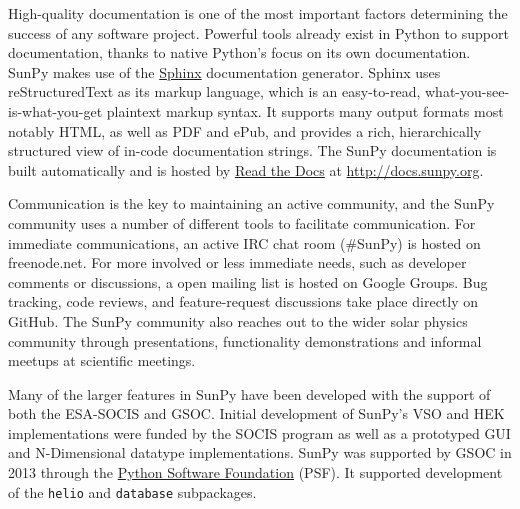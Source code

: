 High-quality documentation is
one of the most important factors determining the success of any software project. 
Powerful tools already exist in Python to support documentation, thanks to native
Python's focus on its own documentation. SunPy makes use of the \href{http://sphinx-doc.org}{Sphinx}
documentation generator. Sphinx uses reStructuredText as its markup language, which is
an easy-to-read, what-you-see-is-what-you-get plaintext markup syntax. It supports
many output formats most notably HTML, as well as PDF and ePub, and provides a rich,
hierarchically structured view of in-code documentation strings. The SunPy documentation 
is built automatically and is hosted by \href{http://readthedocs.org}{Read the 
Docs} at \url{http://docs.sunpy.org}. 

Communication is the key to maintaining an active community, and the SunPy community 
uses a number of different tools to facilitate communication. For immediate communications, an active IRC chat
room (\#SunPy) is hosted on freenode.net. For more involved or less immediate needs, such as
developer comments or discussions, a open mailing list is hosted on Google Groups. 
Bug tracking, code reviews, and feature-request discussions take place directly on GitHub.
The SunPy community also reaches out to the wider solar physics
community through presentations, functionality demonstrations and informal meetups at scientific
meetings. 

Many of the larger features in SunPy have been developed 
with the support of both the ESA-SOCIS and GSOC. 
Initial development of SunPy's VSO and HEK 
implementations were funded by the SOCIS program as well as a prototyped GUI 
and N-Dimensional datatype implementations. SunPy was supported by GSOC in 2013 
through the \href{http://www.python.org/psf/}{Python Software Foundation} (PSF). It supported development of the 
\texttt{helio} and 
\texttt{database} subpackages.

